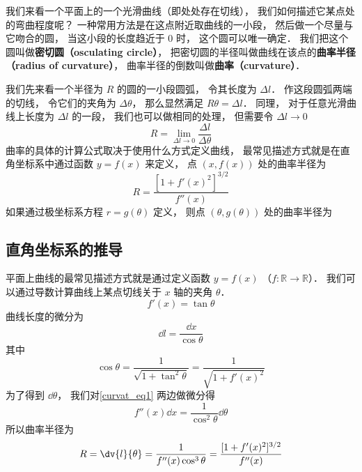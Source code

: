 

我们来看一个平面上的一个光滑曲线（即处处存在切线）， 我们如何描述它某点处的弯曲程度呢？ 一种常用方法是在这点附近取曲线的一小段， 然后做一个尽量与它吻合的圆， 当这小段的长度趋近于 0 时， 这个圆可以唯一确定． 我们把这个圆叫做\textbf{密切圆（osculating circle）}， 把密切圆的半径叫做曲线在该点的\textbf{曲率半径（radius of curvature）}， 曲率半径的倒数叫做\textbf{曲率（curvature）}．

我们先来看一个半径为 $R$ 的圆的一小段圆弧， 令其长度为 $\Delta l$． 作这段圆弧两端的切线， 令它们的夹角为 $\Delta \theta$， 那么显然满足 $R \theta = \Delta l$． 同理， 对于任意光滑曲线上长度为 $\Delta l$ 的一段， 我们也可以做相同的处理， 但需要令 $\Delta l \to 0$
\begin{equation}
R = \lim_{\Delta l \to 0} \frac{\Delta l}{\Delta \theta}
\end{equation}
曲率的具体的计算公式取决于使用什么方式定义曲线， 最常见描述方式就是在直角坐标系中通过函数 $y = f(x)$ 来定义， 点 $(x, f(x))$ 处的曲率半径为
\begin{equation}
R = \frac{[1 + f'(x)^2]^{3/2}}{f''(x)}
\end{equation}
如果通过极坐标系方程 $r = g(\theta)$ 定义， 则点 $(\theta, g(\theta))$ 处的曲率半径为
\begin{equation}

\end{equation}


\subsection{直角坐标系的推导}

平面上曲线的最常见描述方式就是通过定义函数 $y = f(x)$ （$f:\mathbb R \to \mathbb R$）． 我们可以通过导数计算曲线上某点切线关于 $x$ 轴的夹角 $\theta$．
\begin{equation}\label{curvat_eq1}
f'(x) = \tan \theta
\end{equation}
曲线长度的微分为
\begin{equation}
\dd{l} = \frac{\dd{x}}{\cos\theta}
\end{equation}
其中
\begin{equation}\label{curvat_eq2}
\cos\theta = \frac{1}{\sqrt{1 + \tan^2\theta}} = \frac{1}{\sqrt{1 + f'(x)^2}}
\end{equation}
为了得到 $\dd{\theta}$， 我们对\autoref{curvat_eq1} 两边做微分得
\begin{equation}
f''(x) \dd{x} = \frac{1}{\cos^2\theta} \dd{\theta}
\end{equation}
所以曲率半径为
\begin{equation}
R = \dv{l}{\theta} = \frac{1}{f''(x)\cos^3\theta} = \frac{[1 + f'(x)^2]^{3/2}}{f''(x)}
\end{equation}

